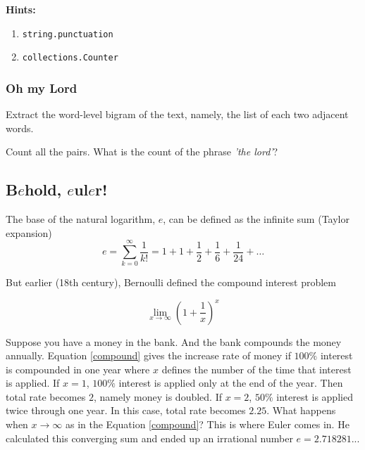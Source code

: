 \documentclass[a4paper]{article}
\begin{document}
\textbf{Hints:}
\begin{enumerate}
    \item \texttt{string.punctuation}
    \item \texttt{collections.Counter}
\end{enumerate}

\subsubsection{Oh my Lord}
Extract the word-level bigram of the text, namely, the list of each two adjacent words.
\par
Count all the pairs. What is the count of the phrase \textit{'the lord'}?

\newpage
\subsection{B$e$hold, $e$ul$e$r!}

The base of the natural logarithm, $e$, can be defined as the infinite sum (Taylor expansion)
\begin{equation}
	e = \sum_{k=0}^{\infty}\frac{1}{k!} = 1 + 1 + \frac{1}{2} + \frac{1}{6} + \frac{1}{24} + \dots
	\label{e_sum}
\end{equation}

But earlier (18th century), Bernoulli defined the compound interest problem

\begin{equation}
    \lim_{x \to \infty} \left(1 + \frac{1}{x}\right)^x
    \label{compound}
\end{equation}

Suppose you have a money in the bank. And the bank compounds the money annually. Equation \ref{compound} gives the increase rate of money if $100\%$ interest is compounded in one year where $x$ defines the number of the time that interest is applied. If $x=1$, $100\%$ interest is applied only at the end of the year. Then total rate becomes $2$, namely money is doubled. If $x=2$, $50\%$ interest is applied twice through one year. In this case, total rate becomes $2.25$. What happens when $x \to \infty$ as in the Equation \ref{compound}? This is where Euler comes in. He calculated this converging sum and ended up an irrational number $e=2.718281...$
\end{document}
